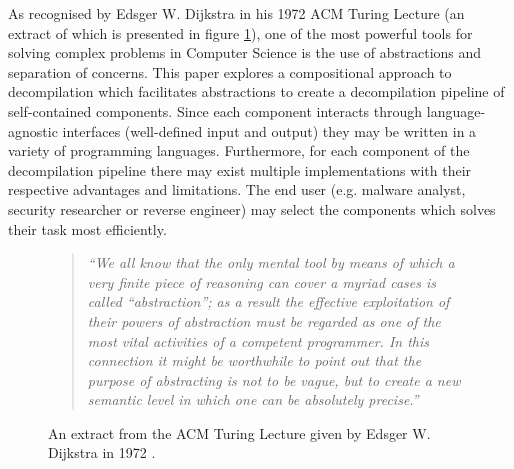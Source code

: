 As recognised by Edsger W. Dijkstra in his 1972 ACM Turing Lecture (an extract of which is presented in figure \ref{fig:dijkstra_lecture}), one of the most powerful tools for solving complex problems in Computer Science is the use of abstractions and separation of concerns. This paper explores a compositional approach to decompilation which facilitates abstractions to create a decompilation pipeline of self-contained components. Since each component interacts through language-agnostic interfaces (well-defined input and output) they may be written in a variety of programming languages. Furthermore, for each component of the decompilation pipeline there may exist multiple implementations with their respective advantages and limitations. The end user (e.g. malware analyst, security researcher or reverse engineer) may select the components which solves their task most efficiently.

\begin{figure}[htbp]
	\begin{quote}
		\textit{``We all know that the only mental tool by means of which a very finite piece of reasoning can cover a myriad cases is called ``abstraction''; as a result the effective exploitation of their powers of abstraction must be regarded as one of the most vital activities of a competent programmer. In this connection it might be worthwhile to point out that the purpose of abstracting is not to be vague, but to create a new semantic level in which one can be absolutely precise.''}
	\end{quote}
	\caption{An extract from the ACM Turing Lecture given by Edsger W. Dijkstra in 1972 \cite{abstractions_quote}.}
	\label{fig:dijkstra_lecture}
\end{figure}





